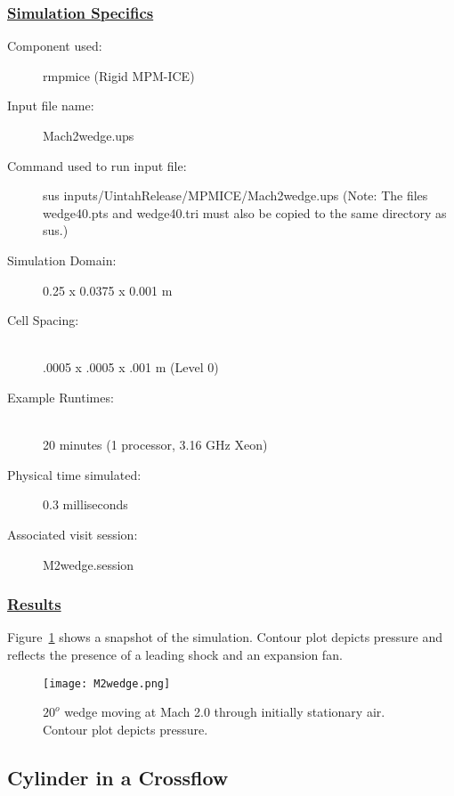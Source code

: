 \subsubsection*{\underline{Simulation Specifics}}
\begin{description}
\item [Component used:] \hfill rmpmice (Rigid MPM-ICE)
\item [Input file name:] \hfill Mach2wedge.ups
\item [Command used to run input file:]\hfill sus inputs/UintahRelease/MPMICE/Mach2wedge.ups
(Note: The files wedge40.pts and wedge40.tri must also be copied to
the same directory as sus.)

\item [Simulation Domain:]\hfill    0.25 x 0.0375 x 0.001 m

\item [Cell Spacing:]\hfill \\
.0005 x .0005 x .001 m (Level 0)

\item [Example Runtimes:] \hfill \\
 20 minutes   (1 processor, 3.16 GHz Xeon)\\

\item [Physical time simulated:] \hfill 0.3 milliseconds

\item [Associated visit session:] \hfill M2wedge.session

\end{description}

\newpage

\subsubsection*{\underline{Results}}

Figure~\ref{figwedge} shows a snapshot of the simulation.  Contour
plot depicts pressure and reflects the presence of a leading shock
and an expansion fan.
\begin{figure}
  \center
  \texttt{[image: M2wedge.png]}

  \caption{$20^o$ wedge moving at Mach 2.0 through initially stationary
air.  Contour plot depicts pressure.}
  \label{figwedge}
\end{figure}
\newpage
%
\subsection*{\center Cylinder in a Crossflow}
